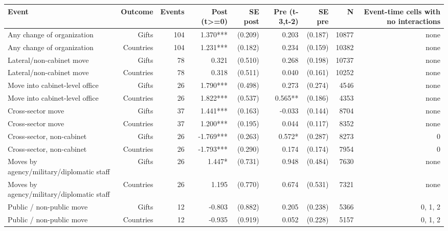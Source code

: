 \begin{tabular}{lrrrrrrrr}
\toprule
Event & Outcome & Events & Post (t>=0) & SE post & Pre (t-3,t-2) & SE pre & N & Event-time cells with no interactions \\
\midrule
Any change of organization & Gifts & 104 & 1.370*** & (0.209) & 0.203 & (0.187) & 10877 & none \\
Any change of organization & Countries & 104 & 1.231*** & (0.182) & 0.234 & (0.159) & 10382 & none \\
Lateral/non-cabinet move & Gifts & 78 & 0.321 & (0.510) & 0.268 & (0.198) & 10737 & none \\
Lateral/non-cabinet move & Countries & 78 & 0.318 & (0.511) & 0.040 & (0.161) & 10252 & none \\
Move into cabinet-level office & Gifts & 26 & 1.790*** & (0.498) & 0.273 & (0.274) & 4546 & none \\
Move into cabinet-level office & Countries & 26 & 1.822*** & (0.537) & 0.565** & (0.186) & 4353 & none \\
Cross-sector move & Gifts & 37 & 1.441*** & (0.163) & -0.033 & (0.144) & 8704 & none \\
Cross-sector move & Countries & 37 & 1.200*** & (0.195) & 0.044 & (0.117) & 8352 & none \\
Cross-sector, non-cabinet & Gifts & 26 & -1.769*** & (0.263) & 0.572* & (0.287) & 8273 & 0 \\
Cross-sector, non-cabinet & Countries & 26 & -1.793*** & (0.290) & 0.174 & (0.174) & 7954 & 0 \\
Moves by agency/military/diplomatic staff & Gifts & 26 & 1.447* & (0.731) & 0.948 & (0.484) & 7630 & none \\
Moves by agency/military/diplomatic staff & Countries & 26 & 1.195 & (0.770) & 0.674 & (0.531) & 7321 & none \\
Public / non-public move & Gifts & 12 & -0.803 & (0.882) & 0.205 & (0.238) & 5366 & 0, 1, 2 \\
Public / non-public move & Countries & 12 & -0.935 & (0.919) & 0.052 & (0.228) & 5157 & 0, 1, 2 \\
\bottomrule
\end{tabular}
\par{}
